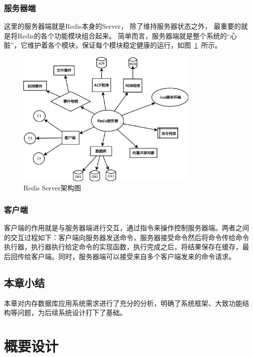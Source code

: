 \documentclass{zjutthesis}
\begin{document}
\subsection{服务器端}
这里的服务器端就是Redis本身的Server， 除了维持服务器状态之外， 最重要的就是将Redis的各个功能模块组合起来。
简单而言，服务器端就是整个系统的“心脏”，它维护着各个模块，保证每个模块稳定健康的运行，如图~\ref{fig:Redis-Server}~所示。
\begin{figure}[H]
\centering
\includegraphics[width=0.8\textwidth]{Redis-Server}
\caption{Redis Server架构图}\label{fig:Redis-Server}
\vspace{\baselineskip} %
\end{figure}

\subsection{客户端}
客户端的作用就是与服务器端进行交互，通过指令来操作控制服务器端。两者之间的交互过程如下：客户端向服务器发送命令，服务器接受命令然后将命令传给命令执行器，执行器执行给定命令的实现函数，执行完成之后，将结果保存在缓存，最后回传给客户端。同时，服务器端可以接受来自多个客户端发来的命令请求。

\section{本章小结}
本章对内存数据库应用系统需求进行了充分的分析，明确了系统框架、大致功能结构等问题，为后续系统设计打下了基础。


\chapter{概要设计}
\end{document}
